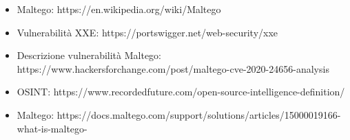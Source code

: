\begin{itemize}
    \item Maltego: https://en.wikipedia.org/wiki/Maltego
    \item Vulnerabilità XXE: https://portswigger.net/web-security/xxe
    \item Descrizione vulnerabilità Maltego: https://www.hackersforchange.com/post/maltego-cve-2020-24656-analysis
    \item OSINT: https://www.recordedfuture.com/open-source-intelligence-definition/
    \item Maltego: https://docs.maltego.com/support/solutions/articles/15000019166-what-is-maltego-
\end{itemize}